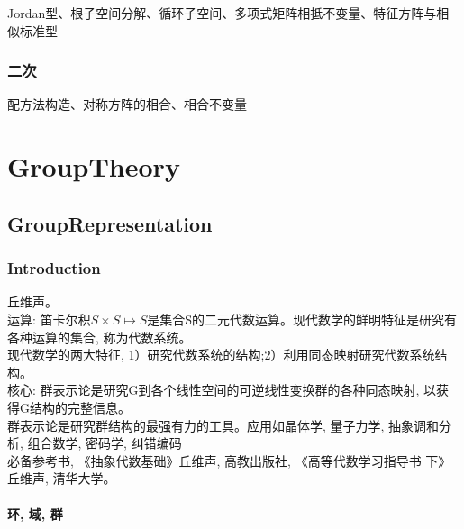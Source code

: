 \documentclass[UTF8]{../09-Mathematics}
\begin{document}
Jordan型、根子空间分解、循环子空间、多项式矩阵相抵不变量、特征方阵与相似标准型

\subsection{二次}
配方法构造、对称方阵的相合、相合不变量




\chapter{GroupTheory}

\section{GroupRepresentation}

\subsection{Introduction}
丘维声。\\
运算: 笛卡尔积$S \times S \mapsto S$是集合S的二元代数运算。现代数学的鲜明特征是研究有各种运算的集合, 称为代数系统。\\
现代数学的两大特征, 1）研究代数系统的结构;2）利用同态映射研究代数系统结构。\\
核心: 群表示论是研究G到各个线性空间的可逆线性变换群的各种同态映射, 以获得G结构的完整信息。\\
群表示论是研究群结构的最强有力的工具。应用如晶体学, 量子力学, 抽象调和分析, 组合数学, 密码学, 纠错编码\\
必备参考书, 《抽象代数基础》丘维声, 高教出版社, 《高等代数学习指导书 下》丘维声, 清华大学。

\subsubsection{环, 域, 群}
\end{document}
